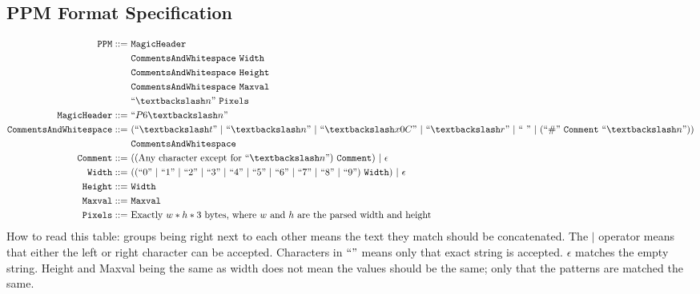 \documentclass{article}
\begin{document}
\subsection*{PPM Format Specification}

\begin{align*}
    \texttt{PPM} ::=&\ \texttt{MagicHeader}\\
                    &\ \texttt{CommentsAndWhitespace}\ \texttt{Width}\\
                    &\ \texttt{CommentsAndWhitespace}\ \texttt{Height}\\
                    &\ \texttt{CommentsAndWhitespace}\ \texttt{Maxval}\\
                    &\ ``{\textbackslash}n"\ \texttt{Pixels}\\
    \texttt{MagicHeader} ::=&\ ``P6{\textbackslash}n"\\
    \texttt{CommentsAndWhitespace} ::=&\ (``{\textbackslash}t"\ |\ ``{\textbackslash}n"\ |\ ``{\textbackslash}x0C"\ |\ ``{\textbackslash}r"\ |\ ``\ "\ |\ (``\#"\ \texttt{Comment}\ ``{\textbackslash}n"))\\
    &\ \texttt{CommentsAndWhitespace}\\
    \texttt{Comment} ::=&\ ((\text{Any character except for } ``{\textbackslash}n")\ \texttt{Comment})\ |\ \epsilon\\
    \texttt{Width} ::=&\ ((``0"\ |\ ``1"\ |\ ``2"\ |\ ``3"\ |\ ``4"\ |\ ``5"\ |\ ``6"\ |\ ``7"\ |\ ``8"\ |\ ``9")\ \texttt{Width})\ |\ \epsilon\\
    \texttt{Height} ::=&\ \texttt{Width}\\
    \texttt{Maxval} ::=&\ \texttt{Maxval}\\
    \texttt{Pixels} ::=&\ \text{Exactly $w*h*3$ bytes, where $w$ and $h$ are the parsed width and height}
\end{align*}
How to read this table: groups being right next to each other means the text they match should be concatenated. The $|$ operator means that either the left or right character can be accepted. Characters in $``"$ means only that exact string is accepted. $\epsilon$ matches the empty string. Height and Maxval being the same as width does not mean the values should be the same; only that the patterns are matched the same.
\end{document}
